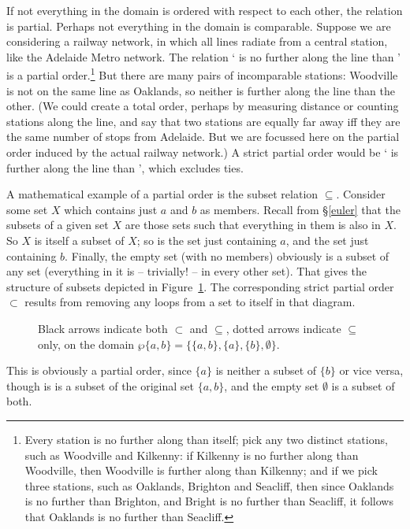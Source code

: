 If not everything in the domain is ordered with respect to each other, the relation is partial. Perhaps not everything in the domain is comparable. Suppose we are considering a railway network, in which all lines radiate from a central station, like the Adelaide Metro network.  The relation ` is no further along the line than ' is a partial order.\footnote{Every station is no further along than itself; pick any two distinct stations, such as Woodville and Kilkenny: if Kilkenny is no further along than Woodville, then Woodville is further along than Kilkenny; and if we pick three stations, such as Oaklands, Brighton and Seacliff, then since Oaklands is no further than Brighton, and Bright is no further than Seacliff, it follows that Oaklands is no further than Seacliff.} But there are many pairs of incomparable stations: Woodville is not on the same line as Oaklands, so neither is further along the line than the other. (We could create a total order, perhaps by measuring distance or counting stations along the line, and say that two stations are equally far away iff they are the same number of stops from Adelaide. But we are focussed here on the partial order induced by the actual railway network.) A strict partial order would be ` is further along the line than ', which excludes ties. 

A mathematical example of a partial order is the subset relation $\subseteq$. Consider some set $X$ which contains just $a$ and $b$ as members. Recall from §\ref{euler} that the subsets of a given set $X$ are those sets such that everything in them is also in $X$. So $X$ is itself a subset of $X$; so is the set just containing $a$, and the set just containing $b$. Finally, the empty set (with no members) obviously is a subset of any set (everything in it is – trivially! – in every other set). That gives the structure of subsets depicted in Figure~\ref{fig:sbst}. The corresponding strict partial order $\subset$ results from removing any loops from a set to itself in that diagram.
 \begin{figure}[t]
 \caption{Black arrows indicate both $\subset$ and $\subseteq$, dotted arrows indicate $\subseteq$ only, on the domain $\wp\{a,b\}=\{\{a,b\},\{a\},\{b\},\emptyset\}$.\label{fig:sbst}}
 \end{figure} This is obviously a partial order, since $\{a\}$ is neither a subset of $\{b\}$ or vice versa, though is is a subset of the original set $\{a,b\}$, and the empty set $\emptyset$ is a subset of both. 


